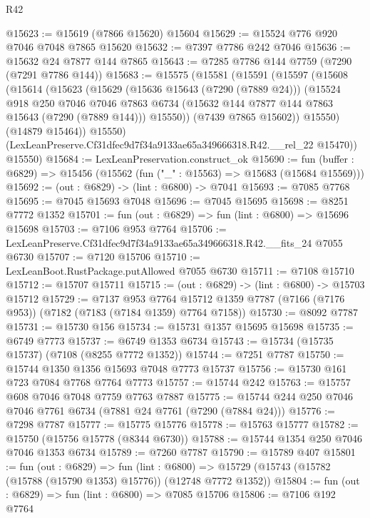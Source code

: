 \begin{lexlean}{R42}
\begin{coremodule}
{@15623 := @15619 (@7866 @15620) @15604
@15629 := @15524 @776 @920 @7046 @7048 @7865 @15620
@15632 := @7397 @7786 @242 @7046
@15636 := @15632 @24 @7877 @144 @7865
@15643 := @7285 @7786 @144 @7759 (@7290 (@7291 @7786 @144))
@15683 := @15575
    (@15581
      (@15591
        (@15597
          (@15608
            (@15614
              (@15623
                (@15629
                  (@15636 @15643 (@7290 (@7889 @24)))
                  (@15524
                    @918
                    @250
                    @7046
                    @7046
                    @7863
                    @6734
                    (@15632 @144 @7877 @144 @7863 @15643 (@7290 (@7889 @144)))
                    @15550))
                (@7439 @7865 @15602))
              @15550)
            (@14879 @15464))
          @15550)
        (LexLeanPreserve.Cf31dfec9d7f34a9133ae65a349666318.R42.__rel_22 @15470))
      @15550)
@15684 := LexLeanPreservation.construct_ok
@15690 := fun (buffer : @6829) => @15456 (@15562 (fun ("_" : @15563) => @15683 (@15684 @15569)))
@15692 := (out : @6829) -> (lint : @6800) -> @7041
@15693 := @7085 @7768
@15695 := @7045 @15693 @7048
@15696 := @7045 @15695
@15698 := @8251 @7772 @1352
@15701 := fun (out : @6829) => fun (lint : @6800) => @15696 @15698
@15703 := @7106 @953 @7764
@15706 := LexLeanPreserve.Cf31dfec9d7f34a9133ae65a349666318.R42.__fits_24 @7055 @6730
@15707 := @7120 @15706
@15710 := LexLeanBoot.RustPackage.putAllowed @7055 @6730
@15711 := @7108 @15710
@15712 := @15707 @15711
@15715 := (out : @6829) -> (lint : @6800) -> @15703 @15712
@15729 := @7137
    @953
    @7764
    @15712
    @1359
    @7787
    (@7166 (@7176 @953))
    (@7182 (@7183 (@7184 @1359) @7764 @7158))
@15730 := @8092 @7787
@15731 := @15730 @156
@15734 := @15731 @1357 @15695 @15698
@15735 := @6749 @7773
@15737 := @6749 @1353 @6734
@15743 := @15734 (@15735 @15737) (@7108 (@8255 @7772 @1352))
@15744 := @7251 @7787
@15750 := @15744 @1350 @1356 @15693 @7048 @7773 @15737
@15756 := @15730 @161 @723 @7084 @7768 @7764 @7773
@15757 := @15744 @242
@15763 := @15757 @608 @7046 @7048 @7759 @7763 @7887
@15775 := @15744 @244 @250 @7046 @7046 @7761 @6734 (@7881 @24 @7761 (@7290 (@7884 @24)))
@15776 := @7298 @7787
@15777 := @15775 @15776
@15778 := @15763 @15777
@15782 := @15750 (@15756 @15778 (@8344 @6730))
@15788 := @15744 @1354 @250 @7046 @7046 @1353 @6734
@15789 := @7260 @7787
@15790 := @15789 @407
@15801 := fun (out : @6829) =>
  fun (lint : @6800) => @15729 (@15743 (@15782 (@15788 (@15790 @1353) @15776)) (@12748 @7772 @1352))
@15804 := fun (out : @6829) => fun (lint : @6800) => @7085 @15706
@15806 := @7106 @192 @7764
}
\end{coremodule}
\end{lexlean}
